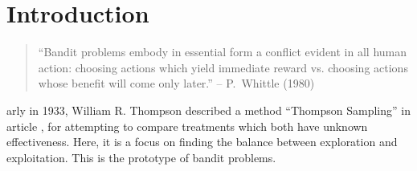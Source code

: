 %
%
\let\textcircled=\pgftextcircled
\chapter{Introduction}
\label{chap:introduction}
\begin{quote}
``Bandit problems embody in essential form a conflict evident in all human action: choosing actions which yield immediate reward vs. choosing actions whose benefit will come only later.''
\hfill
-- P.~Whittle (1980)
\end{quote}
\begin{figure}[h!]
\end{figure}

arly in 1933, William R. Thompson described a method ``Thompson Sampling'' in article \cite{thompson1933likelihood}, for attempting to compare treatments which both have unknown effectiveness. Here, it is a focus on finding the balance between exploration and exploitation. This is the prototype of bandit problems. 

